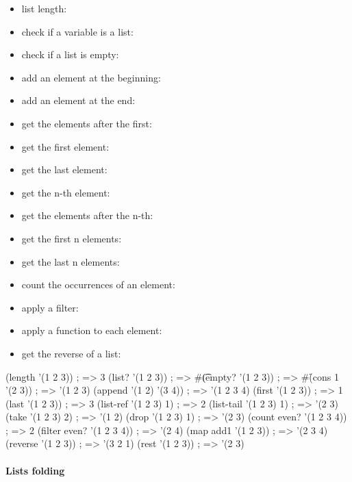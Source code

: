 \documentclass[a4paper,landscape,10pt]{article}
\begin{document}
\begin{multicols*}{2}
  \begin{itemize}
    \item list length: 
    \item check if a variable is a list: 
    \item check if a list is empty: 
    \item add an element at the beginning: 
    \item add an element at the end: 
    \item get the elements after the first: 
    \item get the first element: 
    \item get the last element: 
    \item get the n-th element: 
    \item get the elements after the n-th: 
    \item get the first n elements: 
    \item get the last n elements: 
    \item count the occurrences of an element: 
    \item apply a filter: 
    \item apply a function to each element: 
    \item get the reverse of a list: 
  \end{itemize}

  \breakcolumn

  \begin{racket}
(length '(1 2 3)) ; => 3
(list? '(1 2 3)) ; => #\t
(empty? '(1 2 3)) ; => #\f
(cons 1 '(2 3)) ; => '(1 2 3)
(append '(1 2) '(3 4)) ; => '(1 2 3 4)
(first '(1 2 3)) ; => 1
(last '(1 2 3)) ; => 3
(list-ref '(1 2 3) 1) ; => 2
(list-tail '(1 2 3) 1) ; => '(2 3)
(take '(1 2 3) 2) ; => '(1 2)
(drop '(1 2 3) 1) ; => '(2 3)
(count even? '(1 2 3 4)) ; => 2
(filter even? '(1 2 3 4)) ; => '(2 4)
(map add1 '(1 2 3)) ; => '(2 3 4)
(reverse '(1 2 3)) ; => '(3 2 1)
(rest '(1 2 3)) ; => '(2 3)
\end{racket}

  \paragraph{Lists folding}


\end{multicols*}
\end{document}
